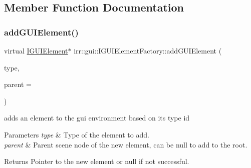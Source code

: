 \subsection{Member Function Documentation}
\mbox{\label{classirr_1_1gui_1_1IGUIElementFactory_aaaa0dda5493286ff745310b441347019}} 
\subsubsection{\texorpdfstring{add\+G\+U\+I\+Element()}{addGUIElement()}\hspace{0.1cm}{\footnotesize\ttfamily [1/2]}}
{\footnotesize\ttfamily virtual \hyperlink{classirr_1_1gui_1_1IGUIElement}{I\+G\+U\+I\+Element}$\ast$ irr\+::gui\+::\+I\+G\+U\+I\+Element\+Factory\+::add\+G\+U\+I\+Element (\begin{DoxyParamCaption}\item[{\hyperlink{namespaceirr_1_1gui_ae4d66df0ecf4117cdbcf9f22404bd254}{E\+G\+U\+I\+\_\+\+E\+L\+E\+M\+E\+N\+T\+\_\+\+T\+Y\+PE}}]{type,  }\item[{\hyperlink{classirr_1_1gui_1_1IGUIElement}{I\+G\+U\+I\+Element} $\ast$}]{parent = {} }\end{DoxyParamCaption})\hspace{0.3cm}{\ttfamily [pure virtual]}}



adds an element to the gui environment based on its type id 


\begin{DoxyParams}{Parameters}
{\em type} & Type of the element to add. \\
\hline
{\em parent} & Parent scene node of the new element, can be null to add to the root. \\
\hline
\end{DoxyParams}
\begin{DoxyReturn}{Returns}
Pointer to the new element or null if not successful. 
\end{DoxyReturn}
\mbox{\label{classirr_1_1gui_1_1IGUIElementFactory_aec55be9ef891ba1b19c5d9c5a85130a4}} 
